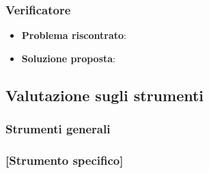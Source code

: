 		\subsubsection{Verificatore}
			\begin{itemize}
				\item \textbf{Problema riscontrato}:
				\item \textbf{Soluzione proposta}:
			\end{itemize}

	\subsection{Valutazione sugli strumenti}

		\subsubsection{Strumenti generali}
		\subsubsection{[Strumento specifico]}	